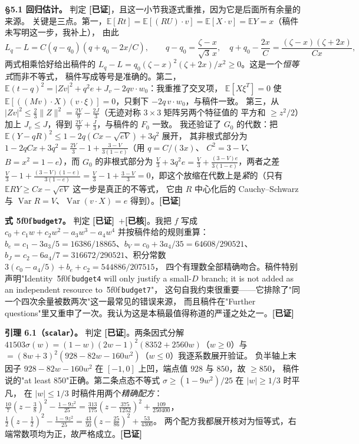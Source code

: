 \documentclass[UTF8,11pt]{ctexart}
\theoremstyle{definition}
\newcommand{\E}{\mathbb{E}}
\newcommand{\Var}{\operatorname{Var}}
\newcommand{\peq}[1]{\textup{\u5f0f}\,\texttt{#1}}
\newcommand{\ok}{\textcolor[rgb]{0.05,0.45,0.15}{\bfseries [已证]}}
\newcommand{\chk}{\textcolor[rgb]{0.05,0.25,0.55}{\bfseries [已核]}}
\begin{document}
\textbf{\S5.1 回归估计。} 判定 \ok，且这一小节我逐式重推，因为它是后面所有余量的来源。
关键是三点。第一，$\E[Rt]=\E[(RU)\cdot v]=\E[X\cdot v]=\E Y=x$（稿件未写明这一步，我补上），
由此
\[
 L_q-L=C(q-q_0)(q+q_0-2x/C),\qquad
 q-q_0=\frac{\zeta-x}{\sqrt3\,x},\quad
 q+q_0-\frac{2x}C=\frac{(\zeta-x)(\zeta+2x)}{Cx},
\]
两式相乘恰好给出稿件的 $L_q-L=q_0(\zeta-x)^2(\zeta+2x)/x^2\ge0$。这是一个\emph{恒等式}而非不等式，
稿件写成等号是准确的。第二，$\E(t-q)^2=|Zv|^2+q^2e+J_v-2qv\cdot w_0$：我重推了交叉项，
$\E[X\xi^T]=0$ 使 $\E[((Mv)\cdot X)(v\cdot\xi)]=0$，只剩下 $-2q\,v\cdot w_0$，与稿件一致。
第三，从 $|Zv|^2\le\frac23\|Z\|^2=\frac{2V}9-\frac{2J}3$（无迹对称 $3\times3$ 矩阵另两个特征值的
平方和 $\ge z^2/2$）加上 $J_v\le J$，得到 $\frac{2V}9+\frac J3$，与稿件的 $F_0$ 一致。
我还验证了 $G_0$ 的代数：把 $\E(Y-qR)^2\le1-2q(Cx-\sqrt{eV})+3q^2$ 展开，
其非根式部分为 $1-2qCx+3q^2=\frac{2V}3-1+\frac{3-V}{3(1-e)}$（用 $q=C/(3x)$、
$C^2=3-V$、$B=x^2=1-e$），而 $G_0$ 的非根式部分为
$\frac V3+3q^2e=\frac V3+\frac{(3-V)e}{3(1-e)}$，两者之差
$\frac V3-1+\frac{(3-V)(1-e)}{3(1-e)}=\frac V3-1+\frac{3-V}3=0$，即这个放缩在代数上是\emph{紧}的（只有 $\E RY\ge Cx-\sqrt{eV}$ 这一步是真正的不等式，
它由 $R$ 中心化后的 Cauchy--Schwarz 与 $\Var R=V$、$\Var(v\cdot X)=e$ 得到）。\hfill\ok

\textbf{式 \peq{budget7}。} 判定 \ok\ $+$\chk。我把 $f$ 写成
$c_0+c_1w+c_2w^2-a_3w^3-a_4w^4$ 并按稿件给的规则重算：
$b_e=c_1-3a_3/5=16386/18865$、$b_V=c_0+3a_4/35=64608/290521$、
$b_J=c_2-6a_4/7=316672/290521$、积分常数 $3(c_0-a_4/5)+b_e+c_2=544886/207515$，
四个有理数全部精确吻合。稿件特别声明"Identity~\peq{budget4} will only justify a small-$D$
branch; it is not added as an independent resource to~\peq{budget7}"，
这句自我约束很重要——它排除了"同一个四次余量被数两次"这一最常见的错误来源，
而且稿件在"Further questions"里又重申了一次。我认为这是本稿最值得称道的严谨之处之一。\hfill\ok

\textbf{引理 6.1（\texttt{scalar}）。} 判定 \ok。两条因式分解
$41503\sigma(w)=(1-w)(2w-1)^2(8352+2560w)$（$w\ge0$）与
$=(8w+3)^2(928-82w-160w^2)$（$w\le0$）我逐系数展开验证。
负半轴上末因子 $928-82w-160w^2$ 在 $[-1,0]$ 上凹，端点值 $928$ 与 $850$，故 $\ge850$，
稿件说的"at least 850"正确。第二条点态不等式 $\sigma\ge(1-9w^2)/25$ 在 $|w|\ge1/3$ 时平凡，
在 $|w|\le1/3$ 时稿件用两个\emph{精确配方}：
$\frac{10}7(z-\frac38)^2-\frac{1-9z^2}{25}=\frac{313}{175}(z-\frac{375}{1252})^2+\frac{109}{250400}$，
$\frac12(z-\frac12)^2-\frac{1-9z^2}{25}=\frac{43}{50}(z-\frac{25}{86})^2+\frac{53}{4300}$。
两个配方我都展开核对为恒等式，右端常数项均为正，故严格成立。\hfill\ok
\end{document}
